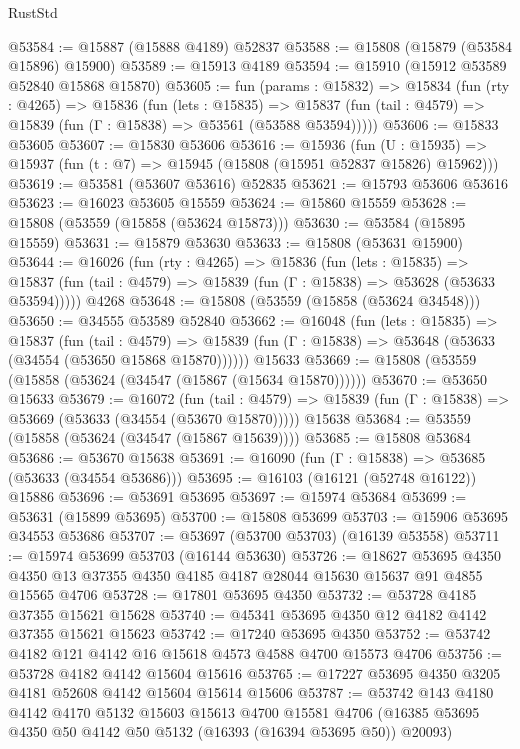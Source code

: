 \begin{lexlean}{RustStd}
\begin{coremodule}
@53584 := @15887 (@15888 @4189) @52837
@53588 := @15808 (@15879 (@53584 @15896) @15900)
@53589 := @15913 @4189
@53594 := @15910 (@15912 @53589 @52840 @15868 @15870)
@53605 := fun (params : @15832) =>
  @15834
    (fun (rty : @4265) =>
    @15836
      (fun (lets : @15835) =>
      @15837 (fun (tail : @4579) => @15839 (fun (Γ : @15838) => @53561 (@53588 @53594)))))
@53606 := @15833 @53605
@53607 := @15830 @53606
@53616 := @15936
    (fun (U : @15935) => @15937 (fun (t : @7) => @15945 (@15808 (@15951 @52837 @15826) @15962)))
@53619 := @53581 (@53607 @53616) @52835
@53621 := @15793 @53606 @53616
@53623 := @16023 @53605 @15559
@53624 := @15860 @15559
@53628 := @15808 (@53559 (@15858 (@53624 @15873)))
@53630 := @53584 (@15895 @15559)
@53631 := @15879 @53630
@53633 := @15808 (@53631 @15900)
@53644 := @16026
    (fun (rty : @4265) =>
    @15836
      (fun (lets : @15835) =>
      @15837 (fun (tail : @4579) => @15839 (fun (Γ : @15838) => @53628 (@53633 @53594)))))
    @4268
@53648 := @15808 (@53559 (@15858 (@53624 @34548)))
@53650 := @34555 @53589 @52840
@53662 := @16048
    (fun (lets : @15835) =>
    @15837
      (fun (tail : @4579) =>
      @15839 (fun (Γ : @15838) => @53648 (@53633 (@34554 (@53650 @15868 @15870))))))
    @15633
@53669 := @15808 (@53559 (@15858 (@53624 (@34547 (@15867 (@15634 @15870))))))
@53670 := @53650 @15633
@53679 := @16072
    (fun (tail : @4579) => @15839 (fun (Γ : @15838) => @53669 (@53633 (@34554 (@53670 @15870)))))
    @15638
@53684 := @53559 (@15858 (@53624 (@34547 (@15867 @15639))))
@53685 := @15808 @53684
@53686 := @53670 @15638
@53691 := @16090 (fun (Γ : @15838) => @53685 (@53633 (@34554 @53686)))
@53695 := @16103 (@16121 (@52748 @16122)) @15886
@53696 := @53691 @53695
@53697 := @15974 @53684
@53699 := @53631 (@15899 @53695)
@53700 := @15808 @53699
@53703 := @15906 @53695 @34553 @53686
@53707 := @53697 (@53700 @53703) (@16139 @53558)
@53711 := @15974 @53699 @53703 (@16144 @53630)
@53726 := @18627
    @53695
    @4350
    @4350
    @13
    @37355
    @4350
    @4185
    @4187
    @28044
    @15630
    @15637
    @91
    @4855
    @15565
    @4706
@53728 := @17801 @53695 @4350
@53732 := @53728 @4185 @37355 @15621 @15628
@53740 := @45341 @53695 @4350 @12 @4182 @4142 @37355 @15621 @15623
@53742 := @17240 @53695 @4350
@53752 := @53742 @4182 @121 @4142 @16 @15618 @4573 @4588 @4700 @15573 @4706
@53756 := @53728 @4182 @4142 @15604 @15616
@53765 := @17227 @53695 @4350 @3205 @4181 @52608 @4142 @15604 @15614 @15606
@53787 := @53742
    @143
    @4180
    @4142
    @4170
    @5132
    @15603
    @15613
    @4700
    @15581
    @4706
    (@16385 @53695 @4350 @50 @4142 @50 @5132 (@16393 (@16394 @53695 @50)) @20093)

\end{coremodule}
\end{lexlean}
